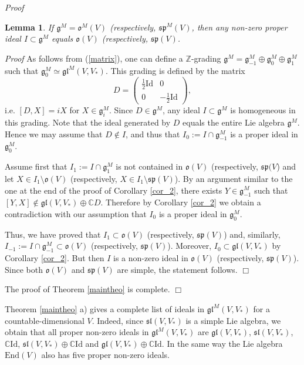 \documentclass[10pt]{amsart}
\newcounter{theorem}
\newtheorem{lemma}[theo]{Lemma}
\renewenvironment{proof}{ \emph{Proof}}{$\Box$}
\newcommand {\CC} {\mathbb {C}}
\renewcommand{\sp}{\mathfrak{sp}}
\renewcommand{\sl}{\mathfrak{sl}}
\newcommand{\ojl}{\mathfrak{gl}}
\newcommand{\id}{\mathrm{Id}}
\newcommand{\oo}{\mathfrak{o}}
\renewcommand{\gg}{\mathfrak{g}}
\newcommand{\gl}{\mathfrak{gl}}
\newcommand{\End}{\mathrm{End}}
\begin{document}
\begin{proof}
\begin{lemma}\label{lem_idideal}
 If $\gg^M = \oo^M(V)$ (respectively, $ \sp^M(V)$, then any non-zero proper ideal $I \subset \gg^M$ 
equals $\oo(V)$  (respectively, $\sp(V)$.
\end{lemma}

\begin{proof} As follows from (\ref{matrix}), one can define a $\mathbb Z$-grading 
 $\gg^M=\gg^M_{-1} \oplus \gg^M_0 \oplus \gg^M_1$ such that $\gg^M_0 \simeq {\ojl}^M(V,V_*)$. 
This  grading is defined by the matrix
\begin{equation}\label{grad_matrix}
D=\left(
\begin{array}{c|c}
 \frac{1}{2}\mathrm{Id} & 0 \\ \hline
 0 & -\frac{1}{2}\mathrm{Id} 
\end{array}
\right), 
\end{equation}
i.e. $[D,X] = iX$ for $X \in \gg^M_i$. Since $D\in\gg^M$, any ideal $I\subset\gg^M$ is homogeneous in this grading. Note that the ideal generated by $D$ equals the entire Lie  algebra  $\gg^M$. Hence we may assume that $D\notin I$, and thus that $I_0 := I \cap \gg^M_{-1}$ is a proper ideal in $\gg^M_0$.  

Assume first that $I_1:=I \cap \gg_1^M$ is not contained in 
$\oo(V)$  (respectively, $\sp(V$) and let $X\in I_1\setminus \oo(V) $ (respectively, $X\in I_1\setminus \sp(V) $). 
By an argument similar to the one at the end of the proof of Corollary \ref{cor_2}, there exists $Y\in \gg^M_{-1}$ such that 
$[Y,X]\notin  \gl(V,V_*)\oplus \CC D$. Therefore by Corollary \ref{cor_2} we obtain a contradiction with our assumption that $I_0$ is a proper ideal in $\gg^M_0$.

Thus, we have proved that $I_1\subset \oo(V)$   (respectively, $\sp(V)$) and, similarly, $I_{-1}:=I \cap \gg_{-1}^M \subset \oo(V)$   (respectively, $\sp(V)$). 
Moreover, $I_0\subset  \gl (V,V_*)$ by Corollary  \ref{cor_2}. But then $I$ is a non-zero ideal in  $\oo(V)$   (respectively, $\sp(V)$).
Since both  $\oo(V)$ and $\sp(V)$ are simple, the statement follows.
\end{proof}

The proof of Theorem \ref{maintheo} is complete.
\end{proof}

\vspace{0.33cm}

Theorem \ref{maintheo} a) gives a complete list of ideals in  $\gl^M(V,V_*)$ for a countable-dimensional $V$. 
Indeed, since $\sl(V,V_*)$ is a simple Lie algebra, we obtain that all 
proper non-zero ideals in $\gl^M(V,V_*)$ are $\gl(V,V_*)$, $\sl(V,V_*)$, $\CC\id$,   $\sl(V,V_*)\oplus\CC\id$ and $\gl(V,V_*)\oplus\CC\id$.
In the same way the Lie algebra $\End(V)$ also has five proper non-zero ideals. 
\end{document}

